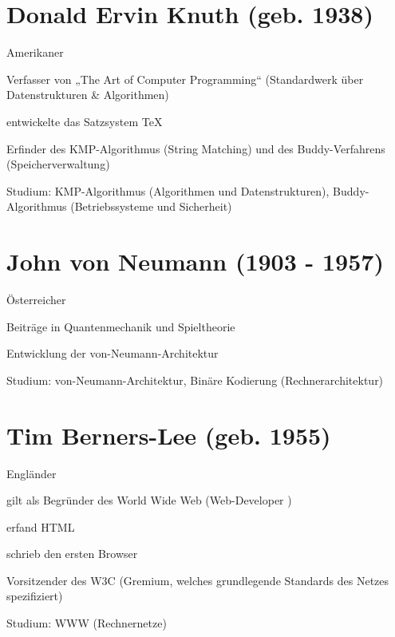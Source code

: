 \documentclass[a4paper,12pt]{scrreprt}
\begin{document}
\section*{Donald Ervin Knuth (geb. 1938)}
\begin{itemize*}
    \item Amerikaner
    \item Verfasser von „The Art of Computer Programming“ (Standardwerk über Datenstrukturen \&
          Algorithmen)
    \item entwickelte das Satzsystem TeX
    \item Erfinder des KMP-Algorithmus (String Matching) und des Buddy-Verfahrens
          (Speicherverwaltung)
    \item Studium: KMP-Algorithmus (Algorithmen und Datenstrukturen), Buddy-Algorithmus
          (Betriebssysteme und Sicherheit)
\end{itemize*}

\section*{John von Neumann (1903 - 1957)}
\begin{itemize*}
    \item Österreicher
    \item Beiträge in Quantenmechanik und Spieltheorie
    \item Entwicklung der von-Neumann-Architektur
    \item Studium: von-Neumann-Architektur, Binäre Kodierung (Rechnerarchitektur)
\end{itemize*}

\section*{Tim Berners-Lee (geb. 1955)}
\begin{itemize*}
    \item Engländer
    \item gilt als Begründer des World Wide Web (Web-Developer \Laughey)
    \item erfand HTML
    \item schrieb den ersten Browser
    \item Vorsitzender des W3C (Gremium, welches grundlegende Standards des Netzes
          spezifiziert)
    \item Studium: WWW (Rechnernetze)
\end{itemize*}

\newpage
\end{document}
